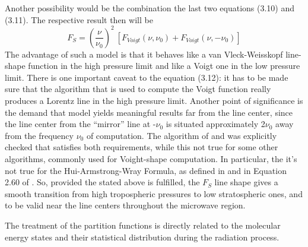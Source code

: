 Another possibility would be the combination the last two equations
(3.10) and (3.11). The respective result then will be 
\begin{equation}
 F_S=\left(\frac{\nu}{\nu_0}\right)^2~[F_{Voigt}(\nu,\nu_0)+F_{Voigt}(\nu,-\nu_0)]
\label{}
\end{equation}
The advantage of such a model is that it behaves like a van
Vleck-Weisskopf line-shape function in the high pressure limit and
like a Voigt one in the low pressure limit. There is one important
caveat to the equation (3.12): it has to be made sure that the
algorithm that is used to compute the Voigt function really produces a
Lorentz line in the high pressure limit. Another point of significance
is the demand that model yields meaningful results far from the line
center, since the line center from the ``mirror'' line at -$\nu_0$ is
situated approximately 2$\nu_0$ away from the frequency $\nu_0$ of
computation. The algorithm of \citet{Drayson:76} and \citet{Oliveiro:77} was explicitly checked that satisfies both
requirements, while this not true for some other algorithms, commonly
used for Voight-shape computation. In particular, the it's not true
for the Hui-Armstrong-Wray Formula, as defined in \citet{hui:78} and in Equation 2.60 of \citet{pwr:93}. So, provided the
stated above is fulfilled, the $F_S$ line shape gives a smooth
transition from high tropospheric pressures to low stratospheric ones,
and to be valid near the line centers throughout the microwave region.

The treatment of the partition functions is directly related to the molecular
energy states and their statistical distribution during the
radiation process. 

